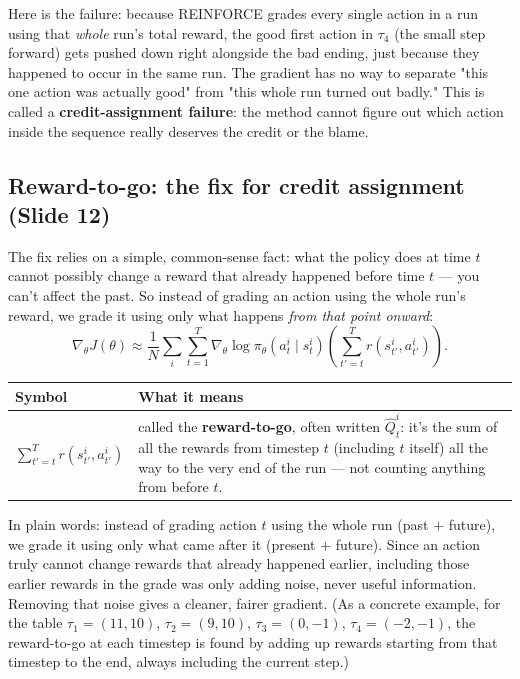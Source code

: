 \documentclass[11pt]{article}
\begin{document}
Here is the failure: because REINFORCE grades every single action in a run using that \emph{whole} run's total reward, the good first action in $\tau_4$ (the small step forward) gets pushed down right alongside the bad ending, just because they happened to occur in the same run. The gradient has no way to separate "this one action was actually good" from "this whole run turned out badly." This is called a \textbf{credit-assignment failure}: the method cannot figure out which action inside the sequence really deserves the credit or the blame.

\subsection{Reward-to-go: the fix for credit assignment (Slide 12)}
The fix relies on a simple, common-sense fact: what the policy does at time $t$ cannot possibly change a reward that already happened before time $t$ --- you can't affect the past. So instead of grading an action using the whole run's reward, we grade it using only what happens \emph{from that point onward}:
$$\nabla_\theta J(\theta) \approx \frac{1}{N}\sum_i\sum_{t=1}^{T}\nabla_\theta\log\pi_\theta(a^i_t\mid s^i_t)\left(\sum_{t'=t}^{T} r(s^i_{t'},a^i_{t'})\right).$$
\begin{center}
\begin{tabular}{@{} >{\raggedright\arraybackslash}p{} >{\raggedright\arraybackslash}p{} @{}}
\toprule
\textbf{Symbol} & \textbf{What it means} \\
\midrule
$\sum_{t'=t}^{T} r(s^i_{t'},a^i_{t'})$ & called the \textbf{reward-to-go}, often written $\hat Q^i_t$: it's the sum of all the rewards from timestep $t$ (including $t$ itself) all the way to the very end of the run --- not counting anything from before $t$. \\
\bottomrule
\end{tabular}
\end{center}

In plain words: instead of grading action $t$ using the whole run (past $+$ future), we grade it using only what came after it (present $+$ future). Since an action truly cannot change rewards that already happened earlier, including those earlier rewards in the grade was only adding noise, never useful information. Removing that noise gives a cleaner, fairer gradient. (As a concrete example, for the table $\tau_1=(11,10)$, $\tau_2=(9,10)$, $\tau_3=(0,-1)$, $\tau_4=(-2,-1)$, the reward-to-go at each timestep is found by adding up rewards starting from that timestep to the end, always including the current step.)
\end{document}
